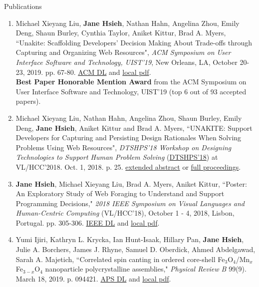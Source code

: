 \documentclass{resume}
\begin{document}
\begin{rSection}{Publications}
\begin{enumerate}
    \item Michael Xieyang Liu, \textbf{Jane Hsieh}, Nathan Hahn, Angelina Zhou, Emily Deng, Shaun Burley, Cynthia Taylor, Aniket Kittur, Brad A. Myers, ``Unakite: Scaffolding Developers’ Decision Making About Trade-offs through Capturing and Organizing Web Resources", \textit{ACM Symposium on User Interface Software and Technology, UIST'19}, New Orleans, LA, October 20-23, 2019. pp. 67-80. \href{https://dl.acm.org/citation.cfm?id=3347908}{ACM DL} and \href{http://www.cs.cmu.edu/~NatProg/papers/p67-liu-Unakite-UIST.pdf}{local pdf}.\\
    \textbf{Best Paper Honorable Mention Award} from the ACM Symposium on User Interface Software and Technology, UIST'19 (top 6 out of 93 accepted papers). 
    \item Michael Xieyang Liu, Nathan Hahn, Angelina Zhou, Shaun Burley, Emily Deng, \textbf{Jane Hsieh}, Aniket Kittur and Brad A. Myers, ``UNAKITE: Support Developers for Capturing and Persisting Design Rationales When Solving Problems Using Web Resources", \textit{DTSHPS'18 Workshop on Designing Technologies to Support Human Problem Solving} (\href{https://www.cs.washington.edu/dtshps2018/index.html}{DTSHPS'18}) at VL/HCC'2018. Oct. 1, 2018. p. 25. \href{http://www.cs.cmu.edu/~NatProg/papers/DTSHPS%20paper%207%20-%20one-page-summary-with-references%20v2.pdf}{extended abstract} or \href{https://digital.lib.washington.edu/researchworks/bitstream/handle/1773/42857/DTSHPS18-Proceedings-final%20v2.pdf}{full proceedings}.
    \item \textbf{Jane Hsieh}, Michael Xieyang Liu, Brad A. Myers, Aniket Kittur, ``Poster: An Exploratory Study of Web Foraging to Understand and Support Programming Decisions," \textit{2018 IEEE Symposium on Visual Languages and Human-Centric Computing} (VL/HCC'18), October 1 - 4, 2018, Lisbon, Portugal. pp. 305-306. \href{https://ieeexplore.ieee.org/document/8506517}{IEEE DL} and \href{http://www.cs.cmu.edu/~NatProg/papers/p305-hsieh.pdf}{local pdf}.
    \item Yumi Ijiri, Kathryn L. Krycka, Ian Hunt-Isaak, Hillary Pan, \textbf{Jane Hsieh}, Julie A. Borchers, James J. Rhyne, Samuel D. Oberdick, Ahmed Abdelgawad, Sarah A. Majetich, ``Correlated spin canting in ordered core-shell Fe$_3$O$_4$/Mn$_x$Fe$_{3-x}$O$_4$ nanoparticle polycrystalline assemblies," \textit{Physical Review B} 99(9). March 18, 2019. p. 094421. \href{https://journals.aps.org/prb/abstract/10.1103/PhysRevB.99.094421}{APS DL} and \href{https://janeon.github.io/assets/img/PhysRevB.99.094421.pdf}{local pdf}.


\end{enumerate}
\end{rSection}
\end{document}
